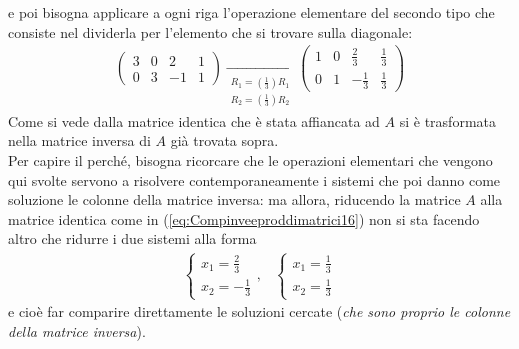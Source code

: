 e poi bisogna applicare a ogni riga l'operazione elementare del
secondo tipo che consiste nel dividerla per l'elemento che si
trovare sulla diagonale:
\begin{eqnarray}
  \label{eq:Compinveeproddimatrici16}
  \left(\begin{array}{cc|cc}
    3 & 0 & 2 & 1\\
    0 & 3 & -1 & 1
  \end{array}\right) \underset{
  \begin{matrix}
    R_1=\left(\frac{1}{3}\right) R_1\\
    R_2=\left(\frac{1}{3}\right) R_2
  \end{matrix}
  }{\to}\left(
  \begin{array}{cc|cc}
    1 & 0 & \frac{2}{3} & \frac{1}{3}\\
    0 & 1 & -\frac{1}{3}& \frac{1}{3}
  \end{array}\right)
\end{eqnarray}
Come si vede dalla matrice identica che è stata affiancata ad $A$
si è trasformata nella matrice inversa di $A$ già trovata sopra.\\
Per capire il perché, bisogna ricorcare che le operazioni elementari
che vengono qui svolte servono a risolvere contemporaneamente i
sistemi che poi danno come soluzione le colonne della matrice
inversa: ma allora, riducendo la matrice $A$ alla matrice identica
come in (\ref{eq:Compinveeproddimatrici16}) non si sta facendo altro
che ridurre i due sistemi alla forma
\begin{eqnarray*}
  \begin{cases}
    x_1=\frac{2}{3}\\
    x_2=-\frac{1}{3}
  \end{cases}, &
                 \begin{cases}
                   x_1=\frac{1}{3}\\
                   x_2=\frac{1}{3}
                 \end{cases}
\end{eqnarray*}
e cioè far comparire direttamente le soluzioni cercate (\emph{che sono
proprio le colonne della matrice inversa}).


